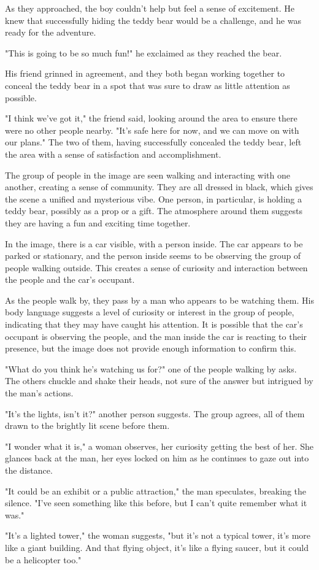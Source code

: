 \documentclass[smalldemyvopaper,11pt,twoside,onecolumn,openright,extrafontsizes]{memoir}
\begin{document}
As they approached, the boy couldn't help but feel a sense of excitement. He knew that successfully hiding the teddy bear would be a challenge, and he was ready for the adventure.\par
"This is going to be so much fun!" he exclaimed as they reached the bear.\par
His friend grinned in agreement, and they both began working together to conceal the teddy bear in a spot that was sure to draw as little attention as possible.\par
"I think we've got it," the friend said, looking around the area to ensure there were no other people nearby. "It's safe here for now, and we can move on with our plans." The two of them, having successfully concealed the teddy bear, left the area with a sense of satisfaction and accomplishment.\par
The group of people in the image are seen walking and interacting with one another, creating a sense of community. They are all dressed in black, which gives the scene a unified and mysterious vibe. One person, in particular, is holding a teddy bear, possibly as a prop or a gift. The atmosphere around them suggests they are having a fun and exciting time together.\par
In the image, there is a car visible, with a person inside. The car appears to be parked or stationary, and the person inside seems to be observing the group of people walking outside. This creates a sense of curiosity and interaction between the people and the car's occupant.\par
As the people walk by, they pass by a man who appears to be watching them. His body language suggests a level of curiosity or interest in the group of people, indicating that they may have caught his attention. It is possible that the car's occupant is observing the people, and the man inside the car is reacting to their presence, but the image does not provide enough information to confirm this.\par
"What do you think he's watching us for?" one of the people walking by asks. The others chuckle and shake their heads, not sure of the answer but intrigued by the man's actions.\par
"It's the lights, isn't it?" another person suggests. The group agrees, all of them drawn to the brightly lit scene before them.\par
"I wonder what it is," a woman observes, her curiosity getting the best of her. She glances back at the man, her eyes locked on him as he continues to gaze out into the distance.\par
"It could be an exhibit or a public attraction," the man speculates, breaking the silence. "I've seen something like this before, but I can't quite remember what it was."\par
"It's a lighted tower," the woman suggests, "but it's not a typical tower, it's more like a giant building. And that flying object, it's like a flying saucer, but it could be a helicopter too."\par
\end{document}
